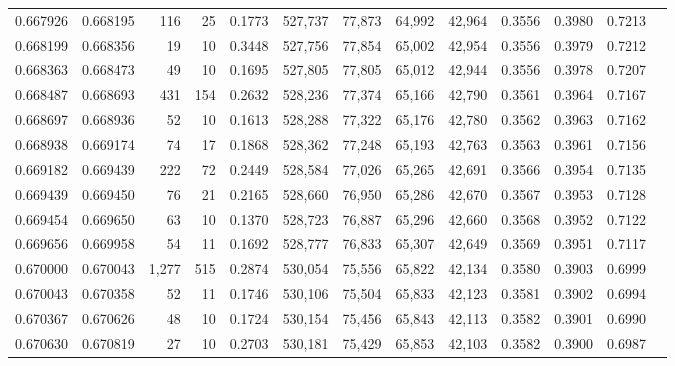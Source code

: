 \begin{tabular}{rrrrrrrrrrrrr}
0.667926 & 0.668195 &   116 &  25 &                                     0.1773 & 527,737 &  77,873 &  64,992 &  42,964 & 0.3556 & 0.3980 & 0.7213 \\
0.668199 & 0.668356 &    19 &  10 &                                     0.3448 & 527,756 &  77,854 &  65,002 &  42,954 & 0.3556 & 0.3979 & 0.7212 \\
0.668363 & 0.668473 &    49 &  10 &                                     0.1695 & 527,805 &  77,805 &  65,012 &  42,944 & 0.3556 & 0.3978 & 0.7207 \\
0.668487 & 0.668693 &   431 & 154 &                                     0.2632 & 528,236 &  77,374 &  65,166 &  42,790 & 0.3561 & 0.3964 & 0.7167 \\
0.668697 & 0.668936 &    52 &  10 &                                     0.1613 & 528,288 &  77,322 &  65,176 &  42,780 & 0.3562 & 0.3963 & 0.7162 \\
0.668938 & 0.669174 &    74 &  17 &                                     0.1868 & 528,362 &  77,248 &  65,193 &  42,763 & 0.3563 & 0.3961 & 0.7156 \\
0.669182 & 0.669439 &   222 &  72 &                                     0.2449 & 528,584 &  77,026 &  65,265 &  42,691 & 0.3566 & 0.3954 & 0.7135 \\
0.669439 & 0.669450 &    76 &  21 &                                     0.2165 & 528,660 &  76,950 &  65,286 &  42,670 & 0.3567 & 0.3953 & 0.7128 \\
0.669454 & 0.669650 &    63 &  10 &                                     0.1370 & 528,723 &  76,887 &  65,296 &  42,660 & 0.3568 & 0.3952 & 0.7122 \\
0.669656 & 0.669958 &    54 &  11 &                                     0.1692 & 528,777 &  76,833 &  65,307 &  42,649 & 0.3569 & 0.3951 & 0.7117 \\
0.670000 & 0.670043 & 1,277 & 515 &                                     0.2874 & 530,054 &  75,556 &  65,822 &  42,134 & 0.3580 & 0.3903 & 0.6999 \\
0.670043 & 0.670358 &    52 &  11 &                                     0.1746 & 530,106 &  75,504 &  65,833 &  42,123 & 0.3581 & 0.3902 & 0.6994 \\
0.670367 & 0.670626 &    48 &  10 &                                     0.1724 & 530,154 &  75,456 &  65,843 &  42,113 & 0.3582 & 0.3901 & 0.6990 \\
0.670630 & 0.670819 &    27 &  10 &                                     0.2703 & 530,181 &  75,429 &  65,853 &  42,103 & 0.3582 & 0.3900 & 0.6987 \\

\end{tabular}

